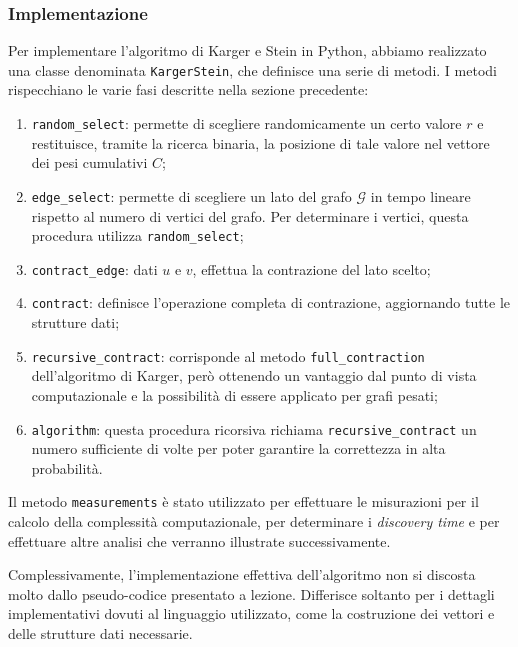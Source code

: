 \subsubsection{Implementazione}
Per implementare l'algoritmo di Karger e Stein in Python, abbiamo realizzato una classe 
denominata \verb|KargerStein|, che definisce una serie di metodi. I metodi rispecchiano 
le varie fasi descritte nella sezione precedente:
\begin{enumerate}
    \item \verb|random_select|: permette di scegliere randomicamente un certo valore 
    $r$ e restituisce, tramite la ricerca binaria, la posizione di tale valore nel 
    vettore dei pesi cumulativi $C$;
    \item \verb|edge_select|: permette di scegliere un lato del grafo $\mathcal{G}$ in 
    tempo lineare rispetto al numero di vertici del grafo. Per determinare i vertici, 
    questa procedura utilizza \verb|random_select|;
    \item \verb|contract_edge|: dati $u$ e $v$, effettua la contrazione del lato scelto;
    \item \verb|contract|: definisce l'operazione completa di contrazione, aggiornando 
    tutte le strutture dati;
    \item \verb|recursive_contract|: corrisponde al metodo \verb|full_contraction| 
    dell'algoritmo di Karger, però ottenendo un vantaggio dal punto di vista 
    computazionale e la possibilità di essere applicato per grafi pesati;
    \item \verb|algorithm|: questa procedura ricorsiva richiama
    \verb|recursive_contract| un numero sufficiente di volte per poter garantire la 
    correttezza in alta probabilità.
\end{enumerate}

Il metodo \verb|measurements| è stato utilizzato per effettuare le misurazioni per il 
calcolo della complessità computazionale, per determinare i \textit{discovery time} e 
per effettuare altre analisi che verranno illustrate successivamente.

Complessivamente, l'implementazione effettiva dell'algoritmo non si discosta molto 
dallo pseudo-codice presentato a lezione. Differisce soltanto per i dettagli 
implementativi dovuti al linguaggio utilizzato, come la costruzione dei vettori e 
delle strutture dati necessarie.

